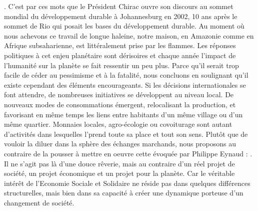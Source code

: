 \transition
{}. C'est par ces mots que le Président Chirac ouvre son discours au sommet mondial du développement durable à Johannesburg en 2002, 10 ans après le sommet de Rio qui posait les bases du développement durable. Au moment où nous achevons ce travail de longue haleine, notre maison, en Amazonie comme en Afrique subsaharienne, est littéralement prise par les flammes. Les réponses politiques à cet enjeu planétaire sont dérisoires et chaque année l'impact de l'humanité sur la planète se fait ressentir un peu plus. Parce qu'il serait  trop facile de céder au pessimisme et à la fatalité, nous concluons en soulignant qu'il existe cependant des éléments encourageants. Si les décisions internationales se font attendre, de nombreuses initiatives se développent au niveau local. De nouveaux modes de consommations émergent, relocalisant la production, et favorisant en même temps les liens entre habitants d'un même village ou d'un même quartier. Monnaies locales, agro-écologie ou covoiturage sont autant d'activités dans lesquelles l'\ess prend toute sa place et tout son sens. Plutôt que de vouloir la diluer dans la sphère des échanges marchands, nous proposons au contraire de la pousser à mettre en oeuvre cette  évoquée par Philippe Eynaud : . Il ne s'agit pas là d'une douce rêverie, mais au contraire d'un réel projet de société, un projet économique et un projet pour la planète. Car le véritable intérêt de l'Economie Sociale et Solidaire ne réside pas dans quelques différences structurelles, mais bien dans sa capacité à créer une dynamique porteuse d'un changement de société.

